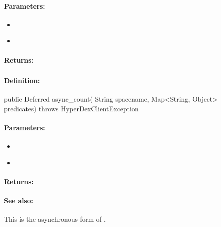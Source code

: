 \paragraph{Parameters:}
\begin{itemize}[noitemsep]
\item {}\\

\item {}\\

\end{itemize}

\paragraph{Returns:}


\pagebreak
\subsubsection{}
\label{api:java:async_count}


\paragraph{Definition:}
\begin{javacode}
public Deferred async_count(
        String spacename,
        Map<String, Object> predicates) throws HyperDexClientException
\end{javacode}

\paragraph{Parameters:}
\begin{itemize}[noitemsep]
\item {}\\

\item {}\\

\end{itemize}

\paragraph{Returns:}


\paragraph{See also:}  This is the asynchronous form of .
